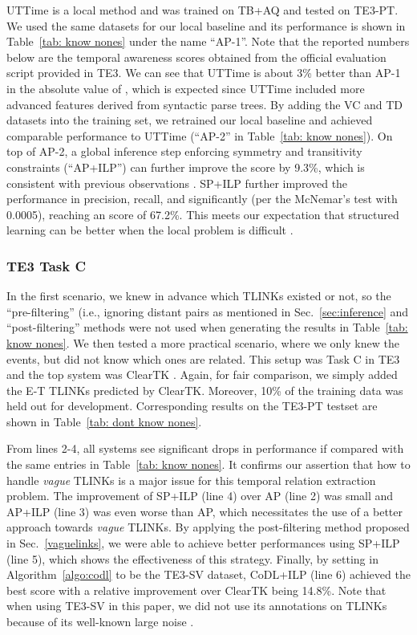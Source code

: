 \documentclass[11pt,letterpaper]{article}
\newcommand{\final}[1]{#1}
\begin{document}
{UTTime is a local method and was trained on TB+AQ and tested on TE3-PT. We used the same datasets for our local baseline and its performance is shown in Table~\ref{tab: know nones} under the name ``AP-1''. Note that the reported numbers below are the temporal awareness scores obtained from the official evaluation script provided in TE3. We can see that UTTime is about 3\% better than AP-1 in the absolute value of , which is expected since UTTime included more advanced features derived from syntactic parse trees.
By adding the VC and TD datasets into the training set, we retrained our local baseline and achieved comparable performance to UTTime (``AP-2'' in Table~\ref{tab: know nones}). On top of AP-2, a global inference step enforcing symmetry and transitivity constraints (``AP+ILP'') can further improve the  score by 9.3\%, which is consistent with previous observations \citep{ChambersJu08, DoLuRo12}. SP+ILP further improved the performance in precision, recall, and  significantly (per the McNemar's test \citep{everitt1992analysis,dietterich1998approximate} with 0.0005), reaching an  score of 67.2\%. This meets our expectation that structured learning can be better when the local problem is difficult \citep{PRYZ05}. 


\subsubsection{\final{TE3 Task C}}
In the first scenario, we knew in advance which TLINKs existed or not, so the ``pre-filtering'' (i.e., ignoring distant pairs as mentioned in Sec.~\ref{sec:inference} and ``post-filtering'' methods were not used when generating \final{the results in} Table~\ref{tab: know nones}.
We then tested a more practical scenario, where we only knew the events, but did not know which ones are related.
This setup was Task C in TE3 and the top system was ClearTK \citep{bethard2013cleartk}. Again, for fair comparison, we simply added the E-T TLINKs predicted by ClearTK. Moreover, 10\% of the training data was held out for development. Corresponding results on the TE3-PT testset are shown in Table~\ref{tab: dont know nones}.

From lines 2-4, all systems see significant drops in performance if compared with the same entries in Table~\ref{tab: know nones}. It confirms our assertion that how to handle {\em vague} TLINKs is a major issue for this temporal relation extraction problem.
The improvement of SP+ILP (line 4) over AP (line 2) was small and AP+ILP (line 3) was even worse than AP, which necessitates the use of a better approach towards {\em vague} TLINKs.
By applying the post-filtering method proposed in Sec.~\ref{vaguelinks}, we were able to achieve better performances using SP+ILP (line 5), which shows the effectiveness of this strategy.
Finally, by setting  in Algorithm~\ref{algo:codl} to be the TE3-SV dataset, CoDL+ILP (line 6) achieved the best  score with a relative improvement over ClearTK being 14.8\%.
Note that when using TE3-SV in this paper, we did not use its annotations on TLINKs because of its well-known large noise \citep{uzzaman2013TE3}.

}
\end{document}

